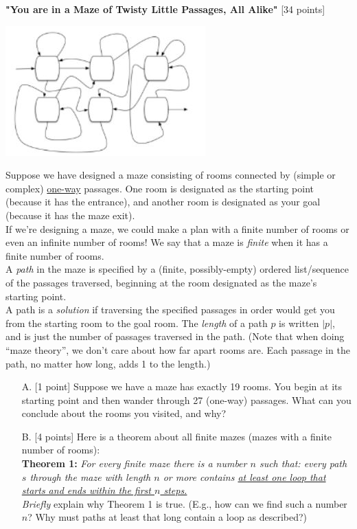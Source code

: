 \documentclass[12pt,letterpaper,boxed,cm]{hmcpset}
\newcommand{\abs}[1]{\left| #1 \right|}
\begin{document}
\begin{problem}[2.] 
    \textbf{"You are in a Maze of Twisty Little Passages, All Alike"} [34 points]\\
    \begin{center}
        \includegraphics{01.jpg}
    \end{center}
    Suppose we have designed a maze consisting of rooms connected by (simple or complex) \ul{one-way} passages. One room is designated as the starting point (because it has the entrance), and another room is designated as your goal (because it has the maze exit). \\

    If we’re designing a maze, we could make a plan with a finite number of rooms or even an infinite number of rooms! We say that a maze is \emph{finite} when it has a finite number of rooms.\\

    A \emph{path} in the maze is specified by a (finite, possibly-empty) ordered list/sequence of the passages traversed, beginning at the room designated as the maze’s starting point. \\
    A path is a \emph{solution} if traversing the specified passages in order would get you from the starting room to the goal room.  The \emph{length} of a path $p$ is written $\abs{p}$, and is just the number of passages traversed in the path. (Note that when doing “maze theory”, we don’t care about how far apart rooms are. Each passage in the path, no matter how long, adds 1 to the length.)
    \begin{enumerate}
        \item [A.] [1 point] Suppose we have a maze has exactly 19 rooms. You begin at its starting point and then wander through 27 (one-way) passages. What can you conclude about the rooms you visited, and why?
        \item [B.] [4 points] Here is a theorem about all finite mazes (mazes with a finite number of rooms):\\

        \textbf{Theorem 1:} \emph{For every finite maze there is a number $n$ such that: every path $s$ through the maze with length $n$ or more contains \ul{at least one loop that starts and ends within the first $n$ steps.}}\\

        \emph{Briefly} explain why Theorem 1 is true.  (E.g., how can we find such a number $n$? Why must paths at least that long contain a loop as described?)
    \end{enumerate}
\end{problem}
\end{document}
